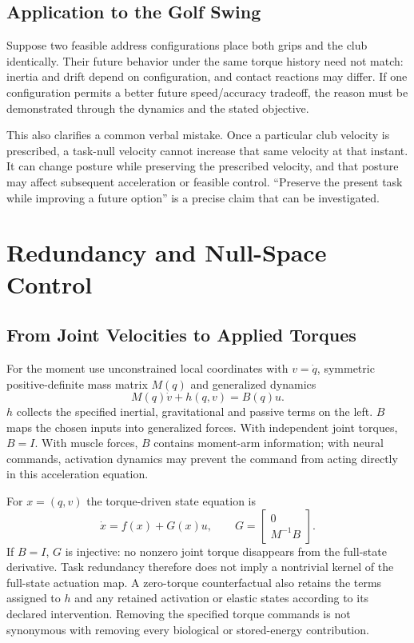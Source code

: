 \subsection{Application to the Golf Swing}

Suppose two feasible address configurations place both grips and the club identically. Their future behavior under the same torque history need not match: inertia and drift depend on configuration, and contact reactions may differ. If one configuration permits a better future speed/accuracy tradeoff, the reason must be demonstrated through the dynamics and the stated objective.

This also clarifies a common verbal mistake. Once a particular club velocity is prescribed, a task-null velocity cannot increase that same velocity at that instant. It can change posture while preserving the prescribed velocity, and that posture may affect subsequent acceleration or feasible control. ``Preserve the present task while improving a future option'' is a precise claim that can be investigated.

\section{Redundancy and Null-Space Control}
\label{dc:box:ch23_null_space_ztcf}
\label{sec:null_space_control}

\subsection{From Joint Velocities to Applied Torques}

For the moment use unconstrained local coordinates with $v=\dot q$, symmetric positive-definite mass matrix $M(q)$ and generalized dynamics
\begin{equation}
M(q)\dot v+h(q,v)=B(q)u.
\end{equation}
$h$ collects the specified inertial, gravitational and passive terms on the left. $B$ maps the chosen inputs into generalized forces. With independent joint torques, $B=I$. With muscle forces, $B$ contains moment-arm information; with neural commands, activation dynamics may prevent the command from acting directly in this acceleration equation.

For $x=(q,v)$ the torque-driven state equation is
\begin{equation}
\dot x=f(x)+G(x)u,\qquad
G=\begin{bmatrix}0\\M^{-1}B\end{bmatrix}.
\label{eq:ch23_ztcf_system}
\end{equation}
If $B=I$, $G$ is injective: no nonzero joint torque disappears from the full-state derivative. Task redundancy therefore does not imply a nontrivial kernel of the full-state actuation map. A zero-torque counterfactual also retains the terms assigned to $h$ and any retained activation or elastic states according to its declared intervention. Removing the specified torque commands is not synonymous with removing every biological or stored-energy contribution.

